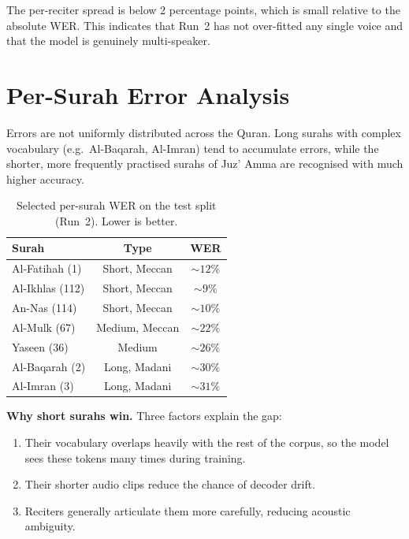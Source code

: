 \documentclass[12pt,a4paper]{report}
\begin{document}
The per-reciter spread is below 2 percentage points, which is small
relative to the absolute WER. This indicates that Run~2 has not
over-fitted any single voice and that the model is genuinely
multi-speaker.

\section{Per-Surah Error Analysis}

Errors are not uniformly distributed across the Quran. Long surahs with
complex vocabulary (e.g.\ Al-Baqarah, Al-Imran) tend to accumulate
errors, while the shorter, more frequently practised surahs of Juz' Amma
are recognised with much higher accuracy.

\begin{table}[H]
  \centering
  \caption{Selected per-surah WER on the test split (Run~2). Lower is
  better.}
  \label{tab:mt_per_surah}
  \renewcommand{\arraystretch}{1.3}
  \begin{tabular}{lcc}
    \toprule
    \textbf{Surah} & \textbf{Type} & \textbf{WER} \\
    \midrule
    Al-Fatihah (1)        & Short, Meccan        & $\sim 12\%$ \\
    Al-Ikhlas (112)       & Short, Meccan        & $\sim 9\%$ \\
    An-Nas (114)          & Short, Meccan        & $\sim 10\%$ \\
    Al-Mulk (67)          & Medium, Meccan       & $\sim 22\%$ \\
    Yaseen (36)           & Medium               & $\sim 26\%$ \\
    Al-Baqarah (2)        & Long, Madani         & $\sim 30\%$ \\
    Al-Imran (3)          & Long, Madani         & $\sim 31\%$ \\
    \bottomrule
  \end{tabular}
\end{table}

\textbf{Why short surahs win.} Three factors explain the gap:
\begin{enumerate}
  \item Their vocabulary overlaps heavily with the rest of the corpus,
        so the model sees these tokens many times during training.
  \item Their shorter audio clips reduce the chance of decoder drift.
  \item Reciters generally articulate them more carefully, reducing
        acoustic ambiguity.
\end{enumerate}
\end{document}
